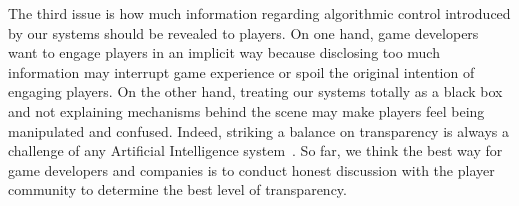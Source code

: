 
The third issue is how much information regarding algorithmic control introduced by our systems should be revealed to players. On one hand, game developers want to engage players in an implicit way because disclosing too much information may interrupt game experience or spoil the original intention of engaging players. On the other hand, treating our systems totally as a black box and not explaining mechanisms behind the scene may make players feel being manipulated and confused. Indeed, striking a balance on transparency is always a challenge of any Artificial Intelligence system~\citep{bostrom2014ethics,ananny2018seeing,scherer2015regulating}. So far, we think the best way for game developers and companies is to conduct honest discussion with the player community to determine the best level of transparency.

